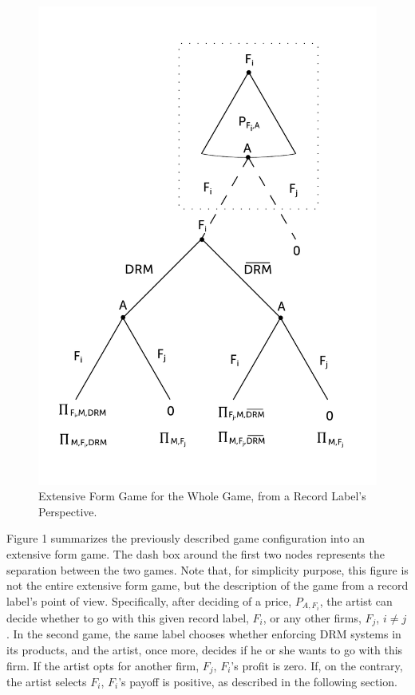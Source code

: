 \documentclass[a4paper,12pt]{article}
\numberwithin{equation}{section}
\begin{document}
\begin{figure}[h]
\centering
\includegraphics[width=12cm]{Graphics/GameTree.pdf}
\caption{Extensive Form Game for the Whole Game, from a Record Label's Perspective.}
\end{figure}

Figure 1 summarizes the previously described game configuration into an extensive form game. The dash box around the first two nodes represents the separation between the two games. Note that, for simplicity purpose, this figure is not the entire extensive form game, but the description of the game from a record label's point of view. Specifically, after deciding of a price, $P_{A, F_i}$, the artist can decide whether to go with this given record label, $F_i$, or any other firms, $F_j$, $i \ne j$. In the second game, the same label chooses whether enforcing DRM systems in its products, and the artist, once more, decides if he or she wants to go with this firm. If the artist opts for another firm, $F_j$, $F_i$'s profit is zero. If, on the contrary, the artist selects $F_i$, $F_i$'s payoff is positive, as described in the following section.
\end{document}
